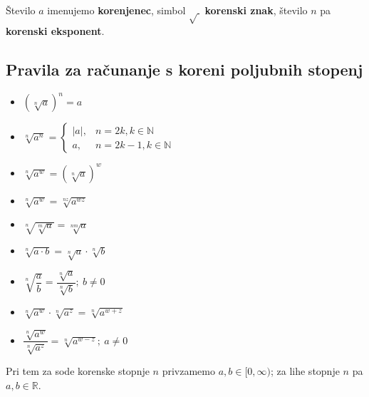                 Število $a$ imenujemo \textbf{korenjenec}, simbol $\sqrt{~}$ \textbf{korenski znak}, število $n$ pa \textbf{korenski eksponent}.
            

        

         
                        
            \subsection*{Pravila za računanje s koreni poljubnih stopenj}
                \begin{multicols}{2}
                    \begin{itemize}
                        \item $\displaystyle \left(\sqrt[n]{a}\right)^n=a$ 
                        \item $\displaystyle \sqrt[n]{a^n}=\begin{cases}
                                \lvert a\rvert, & n=2k, k\in\mathbb{N} \\
                                a, & n=2k-1, k\in\mathbb{N}
                            \end{cases}$ ~
                        \item $\displaystyle \sqrt[n]{a^w}=\left(\sqrt[n]{a}\right)^w$ 
                        \item $\displaystyle \sqrt[n]{a^w}=\sqrt[nz]{a^{wz}}$ 
                        \item $\displaystyle \sqrt[n]{\sqrt[m]{a}}=\sqrt[nm]{a}$ 
                        \item $\displaystyle \sqrt[n]{a\cdot b}=\sqrt[n]{a}\cdot\sqrt[n]{b}$ 
                        \item $\displaystyle \sqrt[n]{\dfrac{a}{b}}=\dfrac{\sqrt[n]{a}}{\sqrt[n]{b}}; ~b\neq 0$ 
                        \item $\displaystyle \sqrt[n]{a^w}\cdot\sqrt[n]{a^z}=\sqrt[n]{a^{w+z}}$ 
                        \item $\displaystyle \dfrac{\sqrt[n]{a^w}}{\sqrt[n]{a^z}}=\sqrt[n]{a^{w-z}}; ~a\neq 0$
                    \end{itemize}

                \end{multicols}
                
                

                Pri tem za sode korenske stopnje $n$ privzamemo $a,b\in[0,\infty)$; za lihe stopnje $n$ pa $a,b\in\mathbb{R}$.
            

